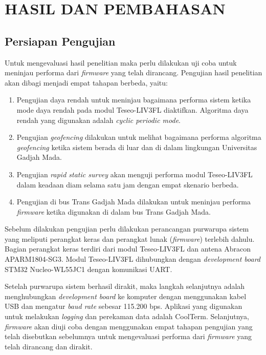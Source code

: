 \chapter{HASIL DAN PEMBAHASAN}

\section{Persiapan Pengujian}
Untuk mengevaluasi hasil penelitian maka perlu dilakukan uji coba untuk meninjau performa dari \textit{firmware} yang telah dirancang. Pengujian hasil penelitian akan dibagi menjadi empat tahapan berbeda, yaitu:

\begin{enumerate}
	\item Pengujian daya rendah untuk meninjau bagaimana performa sistem ketika mode daya rendah pada modul Teseo\hyp{}LIV3FL diaktifkan. Algoritma daya rendah yang digunakan adalah \textit{cyclic periodic mode}.
	\item Pengujian \textit{geofencing} dilakukan untuk melihat bagaimana performa algoritma \textit{geofencing} ketika sistem berada di luar dan di dalam lingkungan Universitas Gadjah Mada.
	\item Pengujian \textit{rapid static survey} akan menguji performa modul Teseo\hyp{}LIV3FL dalam keadaan diam selama satu jam dengan empat skenario berbeda.
	\item Pengujian di bus Trans Gadjah Mada dilakukan untuk meninjau performa \textit{firmware} ketika digunakan di dalam bus Trans Gadjah Mada.
\end{enumerate}

Sebelum dilakukan pengujian perlu dilakukan perancangan purwarupa sistem yang meliputi perangkat keras dan perangkat lunak (\textit{firmware}) terlebih dahulu. Bagian perangkat keras terdiri dari modul Teseo\hyp{}LIV3FL dan antena Abracon APARM1804-SG3. Modul Teseo\hyp{}LIV3FL dihubungkan dengan \textit{development board} STM32 Nucleo-WL55JC1 dengan komunikasi UART.

Setelah purwarupa sistem berhasil dirakit, maka langkah selanjutnya adalah menghubungkan \textit{development board} ke komputer dengan menggunakan kabel USB dan mengatur \textit{baud rate} sebesar 115.200 bps. Aplikasi yang digunakan untuk melakukan \textit{logging} dan perekaman data adalah CoolTerm. Selanjutnya, \textit{firmware} akan diuji coba dengan menggunakan empat tahapan pengujian yang telah disebutkan sebelumnya untuk mengevaluasi performa dari \textit{firmware} yang telah dirancang dan dirakit.

